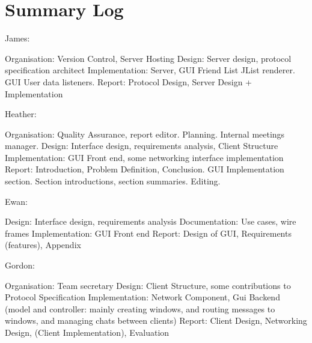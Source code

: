 \section{Summary Log}
\label{sumlog}

James:

Organisation: Version Control, Server Hosting
Design: Server design, protocol specification architect
Implementation: Server, GUI Friend List JList renderer. GUI User data listeners.
Report: Protocol Design, Server Design + Implementation

Heather:

Organisation: Quality Assurance, report editor. Planning. Internal meetings manager.
Design: Interface design, requirements analysis, Client Structure
Implementation: GUI Front end, some networking interface implementation
Report: Introduction, Problem Definition, Conclusion. GUI Implementation section. Section introductions, section summaries. Editing. 

Ewan:

Design: Interface design, requirements analysis
Documentation: Use cases, wire frames
Implementation: GUI Front end
Report: Design of GUI, Requirements (features), Appendix 

Gordon:

Organisation: Team secretary
Design: Client Structure, some contributions to Protocol Specification
Implementation: Network Component, Gui Backend (model and controller: mainly creating windows, and routing messages to windows, and managing chats between clients)
Report: Client Design, Networking Design, (Client Implementation), Evaluation

